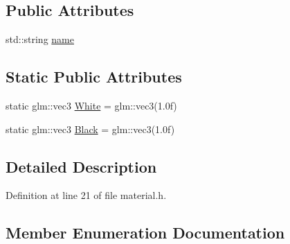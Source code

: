 \subsection*{Public Attributes}
\begin{DoxyCompactItemize}
\item 
std\+::string \hyperlink{class_o_g_l_material_ad8c2aa701fa7d127dec2c3c4a4349ba4}{name}
\end{DoxyCompactItemize}
\subsection*{Static Public Attributes}
\begin{DoxyCompactItemize}
\item 
static glm\+::vec3 \hyperlink{class_o_g_l_material_a7a222f0ece12097de05a1494144c3e27}{White} = glm\+::vec3(1.\+0f)
\item 
static glm\+::vec3 \hyperlink{class_o_g_l_material_acaeb2445a5f20d990e0667a8cdcec863}{Black} = glm\+::vec3(1.\+0f)
\end{DoxyCompactItemize}


\subsection{Detailed Description}


Definition at line 21 of file material.\+h.



\subsection{Member Enumeration Documentation}
\hypertarget{class_o_g_l_material_acd49212071e5ca8ff7093a7536186271}{}
